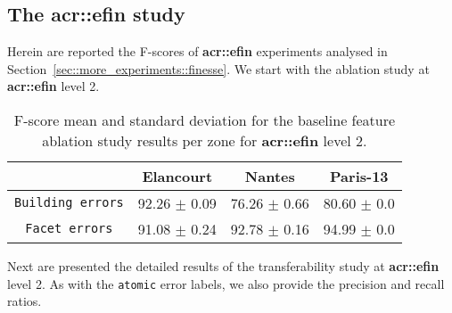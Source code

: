         \FloatBarrier
    \subsection{The \texorpdfstring{\acrlong*{acr::efin}}{eFin} study}
        Herein are reported the F-scores of \textbf{\gls{acr::efin}} experiments analysed in Section~\ref{sec::more_experiments::finesse}.
        We start with the ablation study at \textbf{\gls{acr::efin}} level 2.\\

        \begin{table}[htbp]
            \centering
            \footnotesize
            \begin{tabular}{c c c c}
                \toprule
                & \textbf{Elancourt} & \textbf{Nantes} & \textbf{Paris-13}\\
                \midrule
                \texttt{Building errors} & 92.26 $\pm$ 0.09 & 76.26 $\pm$ 0.66 & 80.60 $\pm$ 0.0 \\
                \midrule
                \texttt{Facet errors} & 91.08 $\pm$ 0.24 & 92.78 $\pm$ 0.16 & 94.99 $\pm$ 0.0 \\
                \bottomrule
            \end{tabular}
            \caption{
                \label{tab::f_score_ablation_f2}
                F-score mean and standard deviation for the baseline feature ablation study results per zone for \textbf{\gls{acr::efin}} level 2.
            }
        \end{table}

        Next are presented the detailed results of the transferability study at \textbf{\gls{acr::efin}} level 2.
        As with the \texttt{atomic} error labels, we also provide the precision and recall ratios.\\

